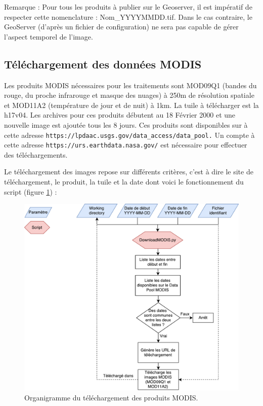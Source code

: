 \documentclass[10pt,a4paper]{article}
\begin{document}
Remarque : Pour tous les produits à publier sur le Geoserver, il est impératif de respecter cette nomenclature : Nom\_YYYYMMDD.tif. Dans le cas contraire, le GeoServer (d'après un fichier de configuration) ne sera pas capable de gérer l'aspect temporel de l'image.

\subsection{Téléchargement des données MODIS}

Les produits MODIS nécessaires pour les traitements sont MOD09Q1 (bandes du rouge, du proche infrarouge et masque des nuages) à 250m de résolution spatiale et MOD11A2 (température de jour et de nuit) à 1km. La tuile à télécharger est la h17v04. Les archives pour ces produits débutent au 18 Février 2000 et une nouvelle image est ajoutée tous les 8 jours. Ces produits sont disponibles sur à cette adresse \verb!https://lpdaac.usgs.gov/data_access/data_pool.! Un compte à cette adresse \verb!https://urs.earthdata.nasa.gov/! est nécessaire pour effectuer des téléchargements.\smallbreak

Le téléchargement des images repose sur différents critères, c'est à dire le site de téléchargement, le produit, la tuile et la date dont voici le fonctionnement du script (figure \ref{orgDL}) :

\begin{figure}[!h]
\centering
\includegraphics[scale=0.53]{img/orgDownload.pdf}
\caption{Organigramme du téléchargement des produits MODIS.}
\label{orgDL}
\end{figure}
\end{document}
